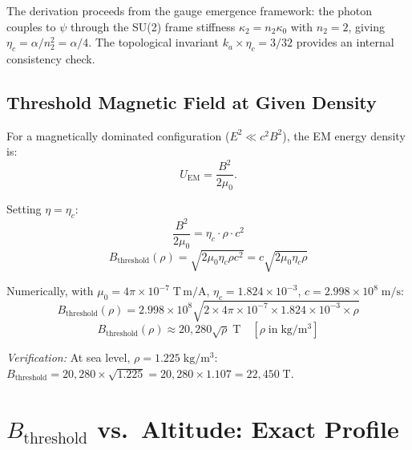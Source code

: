 \documentclass[11pt,a4paper]{article}
\begin{document}
The derivation proceeds from the gauge emergence framework: the photon couples to
$\psi$ through the SU(2) frame stiffness $\kappa_2 = n_2 \kappa_0$ with $n_2 = 2$,
giving $\eta_c = \alpha/n_2^2 = \alpha/4$. The topological invariant
$k_a \times \eta_c = 3/32$ provides an internal consistency check.

\subsection{Threshold Magnetic Field at Given Density}

For a magnetically dominated configuration ($E^2 \ll c^2 B^2$), the EM energy
density is:
\begin{equation}
U_{\mathrm{EM}} = \frac{B^2}{2\mu_0}.
\end{equation}

Setting $\eta = \eta_c$:
\begin{equation}
\frac{B^2}{2\mu_0} = \eta_c \cdot \rho \cdot c^2
\end{equation}
\begin{equation}\label{eq:Bthreshold}
\boxed{B_{\mathrm{threshold}}(\rho) = \sqrt{2\mu_0 \eta_c \rho c^2}
= c\sqrt{2\mu_0 \eta_c \rho}}
\end{equation}

Numerically, with $\mu_0 = 4\pi \times 10^{-7}\;\mathrm{T\,m/A}$,
$\eta_c = 1.824 \times 10^{-3}$, $c = 2.998 \times 10^8\;\mathrm{m/s}$:
\begin{equation}
B_{\mathrm{threshold}}(\rho) = 2.998 \times 10^8 \sqrt{2 \times 4\pi \times 10^{-7}
\times 1.824 \times 10^{-3} \times \rho}
\end{equation}
\begin{equation}\label{eq:Bnum}
\boxed{B_{\mathrm{threshold}}(\rho) \approx 20{,}280 \sqrt{\rho}\;\mathrm{T}}
\quad [\rho\;\text{in}\;\mathrm{kg/m^3}]
\end{equation}

\textit{Verification:} At sea level, $\rho = 1.225\;\mathrm{kg/m^3}$:
$B_{\mathrm{threshold}} = 20{,}280 \times \sqrt{1.225} = 20{,}280 \times 1.107
= 22{,}450\;\mathrm{T}$. \checkmark

\section{$B_{\mathrm{threshold}}$ vs.\ Altitude: Exact Profile}\label{sec:altitude}
\end{document}
